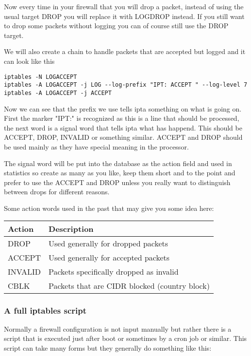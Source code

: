 \documentclass[english,twoside,openright,a4paper,12pt]{article}
\begin{document}
Now every time in your firewall that you will drop a packet, instead
of using the usual target DROP you will replace it with LOGDROP
instead. If you still want to drop some packets without logging you
can of course still use the DROP target.

We will also create a chain to handle packets that are accepted but
logged and it can look like this

\small
\begin{verbatim}
iptables -N LOGACCEPT
iptables -A LOGACCEPT -j LOG --log-prefix "IPT: ACCEPT " --log-level 7
iptables -A LOGACCEPT -j ACCEPT
\end{verbatim}
\normalsize

Now we can see that the prefix we use tells ipta something on what is
going on. First the marker "IPT:" is recognized as this is a line
that should be processed, the next word is a signal word that tells
ipta what has happend. This should be ACCEPT, DROP, INVALID or
something similar. ACCEPT and DROP should be used mainly as they have
special meaning in the processor.

The signal word will be put into the database as the action field and
used in statistics so create as many as you like, keep them short and
to the point and prefer to use the ACCEPT and DROP unless you really
want to distinguish between drops for different reasons.

Some action words used in the past that may give you some idea here:

\begin{table}[H]
\begin{tabular}{ll}
	\textbf{Action} & \textbf{Description  }                        \\ \hline
	DROP            & Used generally for dropped packets            \\
	ACCEPT          & Used generally for accepted packets           \\
	INVALID         & Packets specifically dropped as invalid       \\
	CBLK            & Packets that are CIDR blocked (country block)
\end{tabular}
\end{table}

\subsubsection{A full iptables script}

Normally a firewall configuration is not input manually but rather
there is a script that is executed just after boot or sometimes by a
cron job or similar. This script can take many forms but they
generally do something like this:
\end{document}
